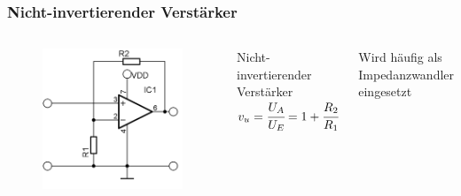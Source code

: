 \begin{frame}
  \frametitle{Nicht-invertierender Verstärker}
  \begin{columns}
    \begin{center}
      \begin{figure}
        \includegraphics[width=\textwidth,height=.85\textheight,keepaspectratio]{a06/OPV-nonInverter.png}
      \end{figure}
    \end{center}
    \centering
    \begin{block}{Nicht-invertierender Verstärker}
      $v_u = \cfrac{U_A}{U_E} = 1+\cfrac{R_2}{R_1}$
    \end{block}
    Wird häufig als Impedanzwandler eingesetzt
  \end{columns}
\end{frame}

